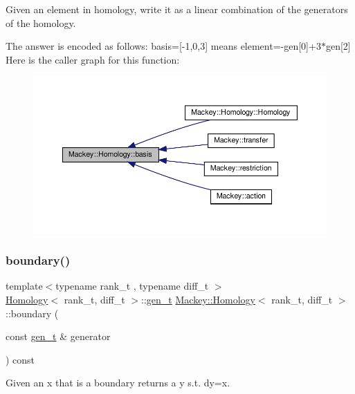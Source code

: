 Given an element in homology, write it as a linear combination of the generators of the homology. 

The answer is encoded as follows\+: basis=\mbox{[}-\/1,0,3\mbox{]} means element=-\/gen\mbox{[}0\mbox{]}+3$\ast$gen\mbox{[}2\mbox{]} Here is the caller graph for this function\+:\nopagebreak
\begin{figure}[H]
\begin{center}
\leavevmode
\includegraphics[width=350pt]{classMackey_1_1Homology_a2e6fb6da3abdba934a1eb2f4236623cb_icgraph}
\end{center}
\end{figure}
\mbox{\label{classMackey_1_1Homology_aeb3cbf5cc7cb166e8e0a552dda57d05b}} 
\subsubsection{\texorpdfstring{boundary()}{boundary()}}
{\footnotesize\ttfamily template$<$typename rank\+\_\+t , typename diff\+\_\+t $>$ \\
\hyperlink{classMackey_1_1Homology}{Homology}$<$ rank\+\_\+t, diff\+\_\+t $>$\+::\hyperlink{classMackey_1_1Homology_adf81f4293a5feba94aa734fcc8c89a46}{gen\+\_\+t} \hyperlink{classMackey_1_1Homology}{Mackey\+::\+Homology}$<$ rank\+\_\+t, diff\+\_\+t $>$\+::boundary (\begin{DoxyParamCaption}\item[{const \hyperlink{classMackey_1_1Homology_adf81f4293a5feba94aa734fcc8c89a46}{gen\+\_\+t} \&}]{generator }\end{DoxyParamCaption}) const}



Given an x that is a boundary returns a y s.\+t. dy=x. 

